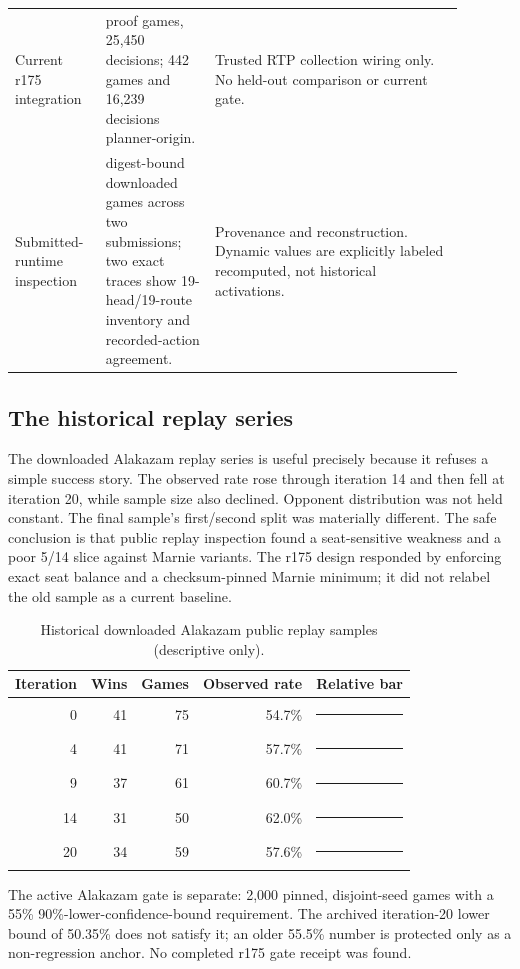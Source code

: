 \documentclass[10pt]{article}
\begin{document}
\begin{longtable}{>{\raggedright\arraybackslash}p{0.17\linewidth}>{\raggedright\arraybackslash}p{0.22\linewidth}>{\raggedright\arraybackslash}p{0.50\linewidth}}
Current r175 integration & 675 proof games, 25,450 decisions; 442 games and 16,239 decisions planner-origin. & Trusted RTP collection wiring only. No held-out comparison or current gate. \\
Submitted-runtime inspection & 126 digest-bound downloaded games across two submissions; two exact traces show 19-head/19-route inventory and recorded-action agreement. & Provenance and reconstruction. Dynamic values are explicitly labeled recomputed, not historical activations. \\
\bottomrule
\end{longtable}
\normalsize

\subsection{The historical replay series}

The downloaded Alakazam replay series is useful precisely because it refuses a simple success story. The observed rate rose through iteration 14 and then fell at iteration 20, while sample size also declined. Opponent distribution was not held constant. The final sample's first/second split was materially different. The safe conclusion is that public replay inspection found a seat-sensitive weakness and a poor 5/14 slice against Marnie variants. The r175 design responded by enforcing exact seat balance and a checksum-pinned Marnie minimum; it did not relabel the old sample as a current baseline.

\begin{table}[htbp]
\centering
\small
\caption{Historical downloaded Alakazam public replay samples (descriptive only).}
\begin{tabular}{rrrrl}
\toprule
Iteration & Wins & Games & Observed rate & Relative bar \\
\midrule
0  & 41 & 75 & 54.7\% & \color{blue}\rule{2.73cm}{1.0ex} \\
4  & 41 & 71 & 57.7\% & \color{blue}\rule{2.89cm}{1.0ex} \\
9  & 37 & 61 & 60.7\% & \color{blue}\rule{3.03cm}{1.0ex} \\
14 & 31 & 50 & 62.0\% & \color{blue}\rule{3.10cm}{1.0ex} \\
20 & 34 & 59 & 57.6\% & \color{blue}\rule{2.88cm}{1.0ex} \\
\bottomrule
\end{tabular}
\end{table}

The active Alakazam gate is separate: 2,000 pinned, disjoint-seed games with a 55\% 90\%-lower-confidence-bound requirement. The archived iteration-20 lower bound of 50.35\% does not satisfy it; an older 55.5\% number is protected only as a non-regression anchor. No completed r175 gate receipt was found.
\end{document}
